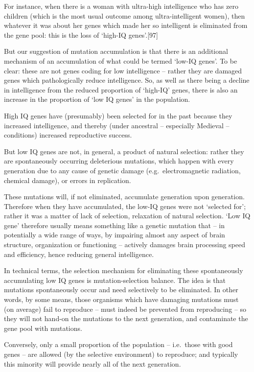 \documentclass[
]{book}
\begin{document}
For instance, when there is a woman with ultra-high intelligence who has zero children (which is the most usual outcome among ultra-intelligent women), then whatever it was about her genes which made her so intelligent is eliminated from the gene pool: this is the loss of `high-IQ genes'.{[}97{]}

But our suggestion of mutation accumulation is that there is an additional mechanism of an accumulation of what could be termed `low-IQ genes'. To be clear: these are not genes coding for low intelligence -- rather they are damaged genes which pathologically reduce intelligence. So, as well as there being a decline in intelligence from the reduced proportion of `high-IQ' genes, there is also an increase in the proportion of `low IQ genes' in the population.

High IQ genes have (presumably) been selected for in the past because they increased intelligence, and thereby (under ancestral -- especially Medieval -- conditions) increased reproductive success.

But low IQ genes are not, in general, a product of natural selection: rather they are spontaneously occurring deleterious mutations, which happen with every generation due to any cause of genetic damage (e.g.~electromagnetic radiation, chemical damage), or errors in replication.

These mutations will, if not eliminated, accumulate generation upon generation. Therefore when they have accumulated, the low-IQ genes were not `selected for'; rather it was a matter of lack of selection, relaxation of natural selection. `Low IQ gene' therefore usually means something like a genetic mutation that -- in potentially a wide range of ways, by impairing almost any aspect of brain structure, organization or functioning -- actively damages brain processing speed and efficiency, hence reducing general intelligence.

In technical terms, the selection mechanism for eliminating these spontaneously accumulating low IQ genes is mutation-selection balance. The idea is that mutations spontaneously occur and need selectively to be eliminated. In other words, by some means, those organisms which have damaging mutations must (on average) fail to reproduce -- must indeed be prevented from reproducing -- so they will not hand-on the mutations to the next generation, and contaminate the gene pool with mutations.

Conversely, only a small proportion of the population -- i.e.~those with good genes -- are allowed (by the selective environment) to reproduce; and typically this minority will provide nearly all of the next generation.
\end{document}
